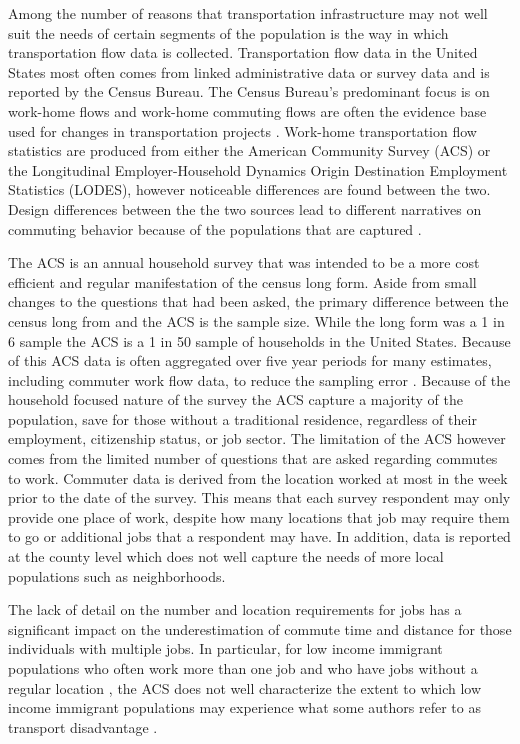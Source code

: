 \documentclass[fleqn,10pt]{olplainarticle}
\begin{document}
Among the number of reasons that transportation infrastructure may not well suit the needs of certain segments of the population is the way in which transportation flow data is collected. Transportation flow data in the United States most often comes from linked administrative data or survey data and is reported by the Census Bureau. The Census Bureau's predominant focus is on work-home flows and work-home commuting flows are often the evidence base used for changes in transportation projects \citep{McKenzie2013}. Work-home transportation flow statistics are produced from either the American Community Survey (ACS) or the Longitudinal Employer-Household Dynamics Origin Destination Employment Statistics (LODES), however noticeable differences are found between the two. Design differences between the the two sources lead to different narratives on commuting behavior because of the populations that are captured \citep{Graham2014}.

The ACS is an annual household survey that was intended to be a more cost efficient and regular manifestation of the census long form. Aside from small changes to the questions that had been asked, the primary difference between the census long from and the ACS is the sample size. While the long form was a 1 in 6 sample the ACS is a 1 in 50 sample of households in the United States. Because of this ACS data is often aggregated over five year periods for many estimates, including commuter work flow data, to reduce the sampling error \citep{Green2017}. Because of the household focused nature of the survey the ACS capture a majority of the population, save for those without a traditional residence, regardless of their employment, citizenship status, or job sector. The limitation of the ACS however comes from the limited number of questions that are asked regarding commutes to work. Commuter data is derived from the location worked at most in the week prior to the date of the survey. This means that each survey respondent may only provide one place of work, despite how many locations that job may require them to go or additional jobs that a respondent may have. In addition, data is reported at the county level which does not well capture the needs of more local populations such as neighborhoods.

The lack of detail on the number and location requirements for jobs has a significant impact on the underestimation of commute time and distance for those individuals with multiple jobs. In particular, for low income immigrant populations who often work more than one job \citep{Menjivar1999a} and who have jobs without a regular location \citep{Chaufan2012}, the ACS does not well characterize the extent to which low income immigrant populations may experience what some authors refer to as transport disadvantage \citep{Delbosc2011}. 
\end{document}
